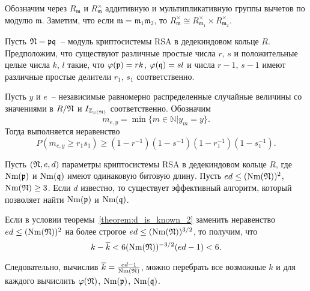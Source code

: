 \documentclass[_00_autoref.tex]{subfiles}
\begin{document}
Обозначим через $R_{\mathfrak{m}}$ и $R_{\mathfrak{m}}^{\times}$ аддитивную и мультипликативную группы вычетов по модулю $\mathfrak{m}$.
Заметим, что если $\mathfrak{m}=\mathfrak{m}_1 \mathfrak{m}_2$, то $R_{\mathfrak{m}}^{\times} \cong R_{\mathfrak{m}_1}^{\times} \times R_{\mathfrak{m}_2}^{\times}$.

\begin{theorem}\label{theorem:iterated}
    Пусть $\mathfrak{N} = \mathfrak{p} \mathfrak{q}$~-- модуль криптосистемы RSA в дедекиндовом кольце $R$.
    Предположим, что существуют различные простые числа $r$, $s$ и положительные целые числа $k$, $l$ такие, что $\varphi(\mathfrak{p}) = rk$, $\varphi(\mathfrak{q}) = sl$ и числа $r - 1$, $s - 1$ имеют различные простые делители $r_1$, $s_1$ соответственно.

    Пусть $y$ и $e$~-- независимые равномерно распределенные случайные величины со значениями в $R / \mathfrak{N}$ и $I_{\mathbb{Z}_{\varphi(\mathfrak{N})}}$ соответственно.
    Обозначим
    \begin{equation*}
        m_{e,y} = \min \{m \in \mathbb{N} | y_m = y\}.
    \end{equation*}
    Тогда выполняется неравенство
    \begin{equation*}
        P(m_{e,y} \ge r_1s_1)\ge(1-r^{-1})(1-s^{-1})(1-r_1^{-1})(1-s_1^{-1}).
    \end{equation*}
\end{theorem}

\begin{theorem}\label{theorem:d_is_known_2}
    Пусть $(\mathfrak{N}, e, d)$ параметры криптосистемы RSA в дедекиндовом кольце $R$, где $\textrm{Nm}(\mathfrak{p})$ и $\textrm{Nm}(\mathfrak{q})$ имеют одинаковую битовую длину.
    Пусть $e d \le (\textrm{Nm}(\mathfrak{N}))^2$, $\textrm{Nm}(\mathfrak{N}) \ge 3$.
    Если $d$ известно, то существует эффективный алгоритм, который позволяет найти $\textrm{Nm}(\mathfrak{p})$ и $\textrm{Nm}(\mathfrak{q})$.
\end{theorem}

\begin{remark}
    Если в условии теоремы~\ref{theorem:d_is_known_2} заменить неравенство $ed \le (\textrm{Nm}(\mathfrak{N}))^2$ на более строгое $e d \le (\textrm{Nm}(\mathfrak{N}))^{3/2}$, то получим, что
    \begin{equation*}
        k - \overline{k} < 6(\textrm{Nm}(\mathfrak{N}))^{-3/2}(ed-1) < 6.
    \end{equation*}
    
    Следовательно, вычислив $\overline{k} = \frac{ed-1}{\textrm{Nm}(\mathfrak{N})}$, можно перебрать все возможные $k$ и для каждого вычислить $\varphi(\mathfrak{N})$, $\textrm{Nm}(\mathfrak{p})$, $\textrm{Nm}(\mathfrak{q})$.
\end{remark}
\end{document}
